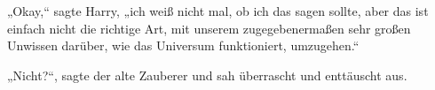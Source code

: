 „Okay,“ sagte Harry, „ich weiß nicht mal, ob ich das sagen sollte, aber das ist einfach nicht die richtige Art, mit unserem zugegebenermaßen sehr großen Unwissen darüber, wie das Universum funktioniert, umzugehen.“

„Nicht?“, sagte der alte Zauberer und sah überrascht und enttäuscht aus.

